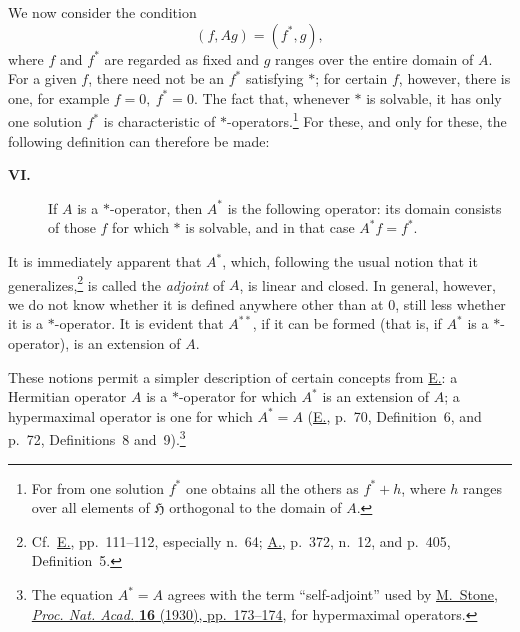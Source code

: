 \documentclass[fontsize=13pt,paper=b5,leqno,bookmarkpackage=false]{scrartcl}
\begin{document}
We now consider the condition
\begin{equation}
  (f,Ag)=(f^*,g),
  \tag*{\(*\)}\label{eq:intro-adjoint-condition}
\end{equation}
where \(f\) and \(f^*\) are regarded as fixed and \(g\) ranges over the
entire domain of \(A\). For a given \(f\), there need not be an \(f^*\)
satisfying \hyperref[eq:intro-adjoint-condition]{\(*\)}; for certain \(f\), however,
there is one, for example \(f=0,\ f^*=0\). The fact that, whenever
\hyperref[eq:intro-adjoint-condition]{\(*\)} is solvable, it has only one solution
\(f^*\) is characteristic of \(*\)-operators.\footnote{\label{fn:5}%
For from one solution \(f^*\) one obtains all the others as \(f^*+h\),
where \(h\) ranges over all elements of \(\mathfrak H\) orthogonal to the
domain of \(A\).} For these, and only for these, the following definition
can therefore be made:

\begin{description}
\item[\textbf{VI.}]
If \(A\) is a \(*\)-operator, then \(A^*\) is the following operator: its
domain consists of those \(f\) for which
\hyperref[eq:intro-adjoint-condition]{\(*\)} is solvable, and in that case
\(A^*f=f^*\).
\end{description}

It is immediately apparent that \(A^*\), which, following the usual
notion that it generalizes,\footnote{\label{fn:6}%
Cf.\ \hyperlink{bib:E}{E.}, pp.~111--112, especially n.~64;
\hyperlink{bib:A}{A.}, p.~372, n.~12, and p.~405, Definition~5.}
is called the \emph{adjoint} of \(A\), is linear
and closed. In general, however, we do not know whether it is defined
anywhere other than at \(0\), still less whether it is a
\(*\)-operator. It is evident that \(A^{**}\), if it can be formed
(that is, if \(A^*\) is a \(*\)-operator), is an extension of \(A\).

These notions permit a simpler description of certain concepts from
\hyperlink{bib:E}{E.}:
a Hermitian operator \(A\) is a \(*\)-operator for which \(A^*\) is an
extension of \(A\); a hypermaximal operator is one for which \(A^*=A\)
(\hyperlink{bib:E}{E.}, p.~70, Definition~6, and p.~72,
Definitions~8 and~9).\footnote{%
\label{fn:7}The equation \(A^*=A\) agrees with the term ``self-adjoint''
used by \hypertarget{bib:Stone1930}{\href{https://doi.org/10.1073/pnas.16.2.172}{%
M.~Stone, \emph{Proc. Nat. Acad.} \textbf{16} (1930), pp.~173--174}},
for hypermaximal operators.}
\end{document}
